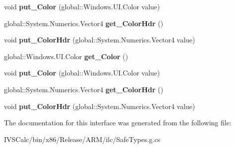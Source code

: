 \begin{DoxyCompactItemize}
\item 
\mbox{\label{interface_microsoft_1_1_graphics_1_1_canvas_1_1_effects_1_1_i_color_source_effect_a17effd9cb9a95014df26cbf2025646c0}} 
void {\bfseries put\+\_\+\+Color} (global\+::\+Windows.\+U\+I.\+Color value)
\item 
\mbox{\label{interface_microsoft_1_1_graphics_1_1_canvas_1_1_effects_1_1_i_color_source_effect_a73ecfb5be4f1df5727129a8e1890fa9c}} 
global\+::\+System.\+Numerics.\+Vector4 {\bfseries get\+\_\+\+Color\+Hdr} ()
\item 
\mbox{\label{interface_microsoft_1_1_graphics_1_1_canvas_1_1_effects_1_1_i_color_source_effect_ade52d570bb1918a7d17502e62a58a4fb}} 
void {\bfseries put\+\_\+\+Color\+Hdr} (global\+::\+System.\+Numerics.\+Vector4 value)
\item 
\mbox{\label{interface_microsoft_1_1_graphics_1_1_canvas_1_1_effects_1_1_i_color_source_effect_a51af32c76dc06b44a8aa3788f4513beb}} 
global\+::\+Windows.\+U\+I.\+Color {\bfseries get\+\_\+\+Color} ()
\item 
\mbox{\label{interface_microsoft_1_1_graphics_1_1_canvas_1_1_effects_1_1_i_color_source_effect_a17effd9cb9a95014df26cbf2025646c0}} 
void {\bfseries put\+\_\+\+Color} (global\+::\+Windows.\+U\+I.\+Color value)
\item 
\mbox{\label{interface_microsoft_1_1_graphics_1_1_canvas_1_1_effects_1_1_i_color_source_effect_a73ecfb5be4f1df5727129a8e1890fa9c}} 
global\+::\+System.\+Numerics.\+Vector4 {\bfseries get\+\_\+\+Color\+Hdr} ()
\item 
\mbox{\label{interface_microsoft_1_1_graphics_1_1_canvas_1_1_effects_1_1_i_color_source_effect_ade52d570bb1918a7d17502e62a58a4fb}} 
void {\bfseries put\+\_\+\+Color\+Hdr} (global\+::\+System.\+Numerics.\+Vector4 value)
\end{DoxyCompactItemize}


The documentation for this interface was generated from the following file\+:\begin{DoxyCompactItemize}
\item 
I\+V\+S\+Calc/bin/x86/\+Release/\+A\+R\+M/ilc/Safe\+Types.\+g.\+cs\end{DoxyCompactItemize}
